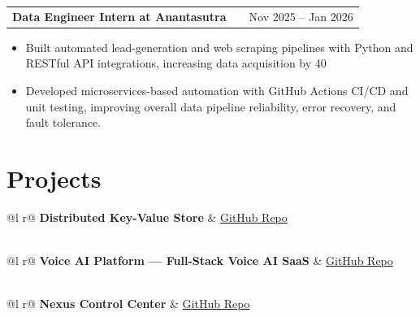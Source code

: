 \documentclass[a4paper,10pt]{article}
\makeatletter
\newenvironment{joblong}[2]
    {
    \begin{tabularx}{\linewidth}{@{}l X r@{}}
    \textbf{#1} & \hfill &  #2 \\[3.50pt]
    \end{tabularx}
    \begin{minipage}[t]{\linewidth}
    \begin{itemize}[nosep,after=\strut, leftmargin=1em, itemsep=3pt,label=--]
    }
    {
    \end{itemize}
    \end{minipage}
    }
\makeatother
\begin{document}
\begin{joblong}{Data Engineer Intern at Anantasutra}{Nov 2025 -- Jan 2026}
\item Built automated lead-generation and web scraping pipelines with Python and RESTful API integrations, increasing data acquisition by 40%
\item Developed microservices-based automation with GitHub Actions CI/CD and unit testing, improving overall data pipeline reliability, error recovery, and fault tolerance.
\end{joblong}

\section{Projects}

\begin{tabularx}{\linewidth}{ @{}l r@{} }
\textbf{Distributed Key-Value Store} & \hfill \href{https://github.com/Abhiboss07/Distributed-KV-Store}{GitHub Repo} \\[2pt]
 \\
\end{tabularx}

\begin{tabularx}{\linewidth}{ @{}l r@{} }
\textbf{Voice AI Platform — Full-Stack Voice AI SaaS} & \hfill \href{https://github.com/Abhiboss07/Voice-Agent}{GitHub Repo} \\[2pt]
  \\
\end{tabularx}

\begin{tabularx}{\linewidth}{ @{}l r@{} }
\textbf{Nexus Control Center} & \hfill \href{https://github.com/Abhiboss07/Nexus}{GitHub Repo} \\[2pt]
  \\
\end{tabularx}
\end{document}

